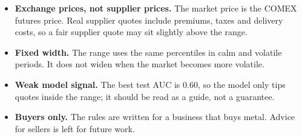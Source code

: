 \begin{itemize}
  \item \textbf{Exchange prices, not supplier prices.} The market price is the
        COMEX futures price. Real supplier quotes include premiums, taxes and
        delivery costs, so a fair supplier quote may sit slightly above the
        range.
  \item \textbf{Fixed width.} The range uses the same percentiles in calm and
        volatile periods. It does not widen when the market becomes more
        volatile.
  \item \textbf{Weak model signal.} The best test AUC is 0.60, so the model
        only tips quotes inside the range; it should be read as a guide, not
        a guarantee.
  \item \textbf{Buyers only.} The rules are written for a business that buys
        metal. Advice for sellers is left for future work.
\end{itemize}
